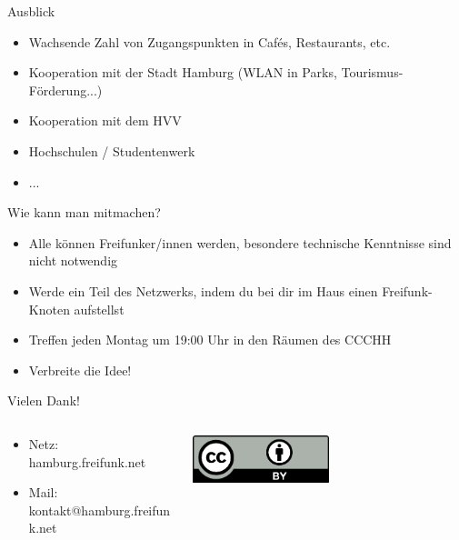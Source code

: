 \documentclass[c]{beamer}
\begin{document}
\begin{frame}{Ausblick}
	\begin{itemize}
		\item Wachsende Zahl von Zugangspunkten in Cafés, Restaurants, etc.
		\item Kooperation mit der Stadt Hamburg (WLAN in Parks, Tourismus-Förderung...)
		\item Kooperation mit dem HVV
		\item Hochschulen / Studentenwerk
		\item ...
	\end{itemize}
\end{frame}



\begin{frame}{Wie kann man mitmachen?}
	\begin{itemize}
		\item Alle können Freifunker/innen werden, besondere technische Kenntnisse sind nicht notwendig
		\item Werde ein Teil des Netzwerks, indem du bei dir im Haus einen Freifunk-Knoten aufstellst
		\item Treffen jeden Montag um 19:00 Uhr in den Räumen des CCCHH
		\item Verbreite die Idee!
	\end{itemize}
\end{frame}



\begin{frame}{Vielen Dank!}
	\begin{columns}
		\begin{column}{0.6\textwidth}
			\begin{itemize}
				\item Netz: hamburg.freifunk.net
				\item Mail: kontakt@hamburg.freifunk.net
		\end{itemize}
		\end{column}
		\begin{column}{0.5\textwidth}
			\begin{center}
				\includegraphics[width=0.5\textwidth]{cc-by}
			\end{center}
		\end{column}
	\end{columns}
\end{frame}
\end{document}
